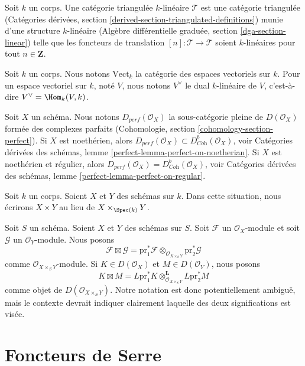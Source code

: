 \noindent
Soit $k$ un corps. Une catégorie triangulée $k$-linéaire $\mathcal{T}$
est une catégorie triangulée (Catégories dérivées, section
\ref{derived-section-triangulated-definitions})
munie d'une structure $k$-linéaire
(Algèbre différentielle graduée, section \ref{dga-section-linear})
telle que les foncteurs de translation $[n] : \mathcal{T} \to \mathcal{T}$
soient $k$-linéaires pour tout $n \in \mathbf{Z}$.

\medskip\noindent
Soit $k$ un corps. Nous notons $\text{Vect}_k$ la catégorie des
espaces vectoriels sur $k$. Pour un espace vectoriel sur $k$, noté $V$, nous notons
$V^\vee$ le dual $k$-linéaire de $V$, c'est-à-dire $V^\vee = \Hom_k(V, k)$.

\medskip\noindent
Soit $X$ un schéma. Nous notons $D_{perf}(\mathcal{O}_X)$ la
sous-catégorie pleine de $D(\mathcal{O}_X)$ formée des complexes parfaits
(Cohomologie, section \ref{cohomology-section-perfect}).
Si $X$ est noethérien, alors
$D_{perf}(\mathcal{O}_X) \subset D^b_{\textit{Coh}}(\mathcal{O}_X)$, voir
Catégories dérivées des schémas, lemme \ref{perfect-lemma-perfect-on-noetherian}.
Si $X$ est noethérien et régulier, alors
$D_{perf}(\mathcal{O}_X) = D^b_{\textit{Coh}}(\mathcal{O}_X)$, voir
Catégories dérivées des schémas, lemme \ref{perfect-lemma-perfect-on-regular}.

\medskip\noindent
Soit $k$ un corps. Soient $X$ et $Y$ des schémas sur $k$. Dans cette
situation, nous écrirons $X \times Y$ au lieu de $X \times_{\Spec(k)} Y$.


\medskip\noindent
Soit $S$ un schéma. Soient $X$ et $Y$ des schémas sur $S$.
Soit $\mathcal{F}$ un $\mathcal{O}_X$-module et soit
$\mathcal{G}$ un $\mathcal{O}_Y$-module. Nous posons
$$
\mathcal{F} \boxtimes \mathcal{G} =
\text{pr}_1^*\mathcal{F} \otimes_{\mathcal{O}_{X \times_S Y}}
\text{pr}_2^*\mathcal{G}
$$
comme $\mathcal{O}_{X \times_S Y}$-module.
Si $K \in D(\mathcal{O}_X)$ et $M \in D(\mathcal{O}_Y)$, nous posons
$$
K \boxtimes M =
L\text{pr}_1^*K \otimes_{\mathcal{O}_{X \times_S Y}}^\mathbf{L} L\text{pr}_2^*M
$$
comme objet de $D(\mathcal{O}_{X \times_S Y})$.
Notre notation est donc potentiellement ambiguë, mais le contexte devrait
indiquer clairement laquelle des deux significations est visée.





\section{Foncteurs de Serre}
\label{section-Serre-functors}

